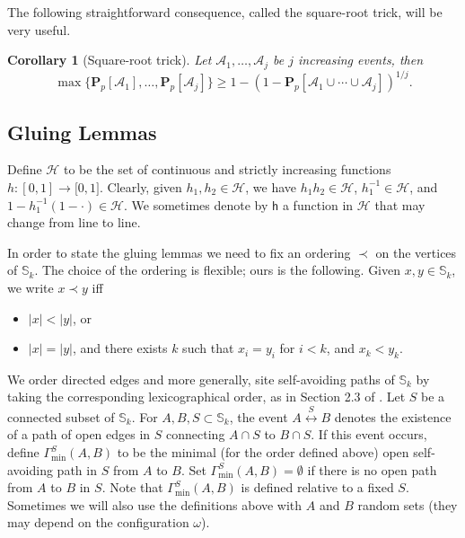 \documentclass[12pt, twoside,a4paper,reqno]{amsart}
\theoremstyle{plain}
\newtheorem{corollary}[theorem]{Corollary}
\theoremstyle{remark}
\theoremstyle{definition}
\newcommand{\PP}{\mathbf{P}}
\newcommand{\Pp}[1]{\PP_p \left [ #1 \right ]}
\newcommand{\lr}[1][]{\overset{\:#1\:}\longleftrightarrow}
\newcommand{\cal}{\mathcal}
\begin{document}
The following straightforward consequence, called the square-root trick, will be
very useful.
\begin{corollary}[Square-root trick]\label{cor:SRT}
  Let $\mathcal A_1,\ldots,\mathcal A_j$ be $j$ increasing events, then
  \begin{equation}
    \label{eq:47}
    \max\{\Pp{\cal A_1},\ldots,\Pp{\mathcal A_j}\} \ge 1-\left(1-\Pp{\cal
      A_1\cup\cdots\cup\cal A_j}\right)^{1/j}.
  \end{equation}
\end{corollary}

\subsection{Gluing Lemmas}

\label{sec:gluing-lemma}

Define $\mathcal{H}$ to be the set of continuous and
strictly increasing functions $h:[0,1]\rightarrow \lbrack 0,1]$. Clearly,
given $h_{1},h_{2}\in \mathcal{H}$, we have $h_{1}h_{2}\in \mathcal{H}$, $%
h_{1}^{-1}\in \mathcal{H}$, and $1-h_{1}^{-1}\left( 1-\cdot \right) \in
\mathcal{H}$. We sometimes denote by $\mathsf{h}$ a function in $\mathcal{H}$ that may change from line to line.

In order to state the gluing lemmas we need to fix an ordering $\prec $ on the
vertices of $\mathbb{S}_{k}$. The choice of the ordering is flexible; ours
is the following. Given $x,y\in \mathbb{S}_{k}$, we write $x\prec
y $ iff

\begin{itemize}
\item $\left\vert x\right\vert <\left\vert y\right\vert $, or

\item $\left\vert x\right\vert =\left\vert y\right\vert $, and there exists $%
k$ such that $x_{i}=y_{i}$ for $i<k$, and $x_{k}<y_{k}$.
\end{itemize}

We order directed edges and more generally, site self-avoiding paths of
$\mathbb{S}_{k}$ by taking the corresponding lexicographical order, as in
Section 2.3 of \cite{DST}. Let $S$ be a connected subset of $\mathbb S_k$. For
$A,B,S\subset \mathbb S_k$, the event $A \lr[S] B$ denotes the existence of a
path of open edges in $S$ connecting $A\cap S$ to $B\cap S$. If this event
occurs, define $\Gamma _{\mathrm{min}}^S(A,B)$ to be the minimal (for the order
defined above) open self-avoiding path in $S$ from $A$ to $B$. Set
$\Gamma^S_{\mathrm{min}}(A,B)=\emptyset$ if there is no open path from $A$ to
$B$ in $S$. Note that $\Gamma^S _{\mathrm{min}}(A,B)$ is defined relative to a
fixed $S$. Sometimes we will also use the definitions above with $A$ and $B$
random sets (they may depend on the configuration $\omega$).
\end{document}
